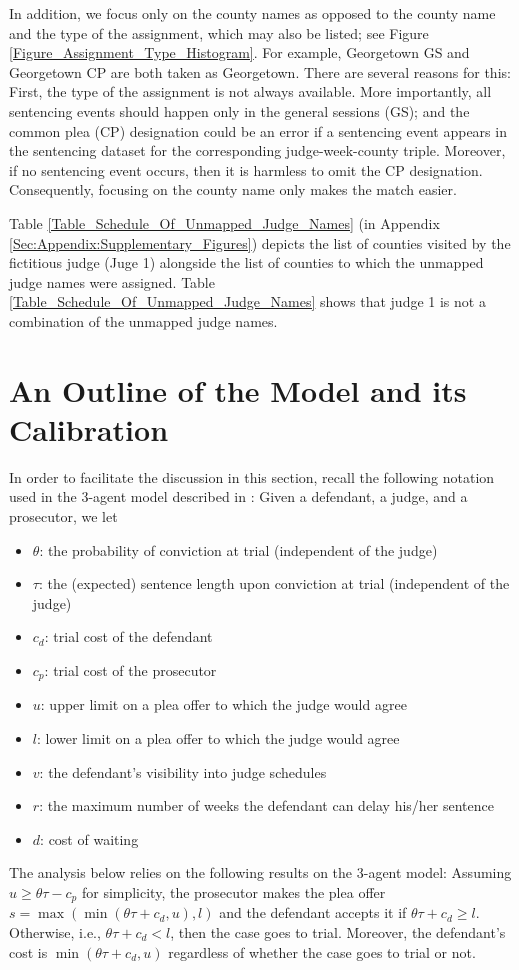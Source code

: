 \documentclass[11pt, oneside]{article}   	%
\theoremstyle{ModifiedStyle}
\begin{document}
In addition, we focus only on the county names as opposed to the county name and the type of the assignment, which may also be listed; see Figure \ref{Figure_Assignment_Type_Histogram}. For example, Georgetown GS and Georgetown CP are both taken as Georgetown. There are several reasons for this: First, the type of the assignment is not always available. More importantly, all sentencing events should happen only in the general sessions (GS); and the common plea (CP) designation could be an error if a sentencing event appears in the sentencing dataset for the corresponding judge-week-county triple. Moreover, if no sentencing event occurs, then it is harmless to omit the CP designation. Consequently, focusing on the county name only makes the match easier.

Table \ref{Table_Schedule_Of_Unmapped_Judge_Names} (in Appendix \ref{Sec:Appendix:Supplementary_Figures}) depicts the list of counties visited by the fictitious judge (Juge 1) alongside the list of counties to which the unmapped judge names were assigned. Table \ref{Table_Schedule_Of_Unmapped_Judge_Names} shows that judge 1 is not a combination of the unmapped judge names.

\section{An Outline of the Model and its Calibration}
In order to facilitate the discussion in this section, recall the following notation used in the 3-agent model described in \citet[Chapter 3]{Can_Disseration}: Given a defendant, a judge, and a prosecutor, we let
\begin{itemize}
	\item[] $\theta$: the probability of conviction at trial (independent of the judge)
	\item[] $\tau$: the (expected) sentence length upon conviction at trial (independent of the judge)
	\item[] $c_d$: trial cost of the defendant
	\item[] $c_p$: trial cost of the prosecutor
	\item[] $u$: upper limit on a plea offer to which the judge would agree
	\item[] $l$: lower limit on a plea offer to which the judge would agree
	\item[] $v$: the defendant's visibility into judge schedules
	\item[] $r$: the maximum number of weeks the defendant can delay
	his/her sentence
	\item[] $d$: cost of waiting
\end{itemize}
The analysis below relies on the following results on the 3-agent model: Assuming $u\geq \theta\tau - c_p$ for simplicity, the prosecutor makes the plea offer $s=\max(\min(\theta \tau+c_d,u),l)$ and the defendant accepts it if $\theta \tau +c_d \geq l$. Otherwise, i.e., $\theta \tau + c_d < l$, then the case goes to trial. Moreover, the defendant's cost is $\min(\theta \tau+c_d,u)$ regardless of whether the case goes to trial or not.
\end{document}
